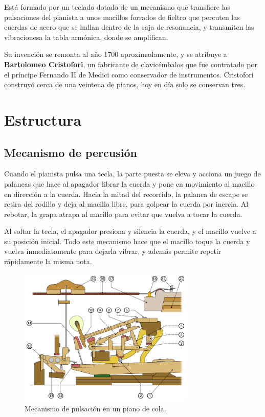 \documentclass[10pt,a4paper]{article}
\begin{document}
	Está formado por un teclado dotado de un mecanismo que transfiere las 
	pulsaciones del pianista a unos macillos forrados de fieltro que percuten 
	las cuerdas de acero que se hallan dentro de la caja de resonancia, y 
	transmiten las vibracionesa la tabla armónica, donde se amplifican.
	
	Su invención se remonta al año 1700 aproximadamente, y se atribuye a \textbf
	{Bartolomeo Cristofori}, un fabricante de clavicémbalos que fue  contratado 
	por el príncipe Fernando II de Medici como conservador de  instrumentos. 
	Cristofori construyó cerca de una veintena de pianos, hoy en día solo se 
	conservan tres.
	
	
	\clearpage
	\section{Estructura}
	
	\subsection{Mecanismo de percusión}
	
	Cuando el pianista pulsa una tecla, la parte puesta se eleva y acciona un 
	juego de palancas que hace al apagador librar la cuerda y pone en 
	movimiento al macillo en dirección a la cuerda. Hacia la mitad del 
	recorrido, la palanca de escape se retira del rodillo y deja al macillo 
	libre, para golpear la cuerda por inercia. Al rebotar, la grapa atrapa al 
	macillo para evitar que vuelva a tocar la cuerda.
	
	Al soltar la tecla, el apagador presiona y silencia la cuerda, y el macillo 
	vuelve a su posición inicial. Todo este mecanismo hace que el macillo 
	toque la cuerda y vuelva inmediatamente para dejarla vibrar, y además 
	permite repetir rápidamente la misma nota.
	
	\begin{figure}[!ht]
		\centering
		\includegraphics[width=0.75\textwidth]{images/pulsation}
		\caption[Mecanismo de pulsación]{\label{fig:pulsation} Mecanismo de pulsación en un piano de cola. \cite{pulsation}}
	\end{figure}
	
\end{document}
